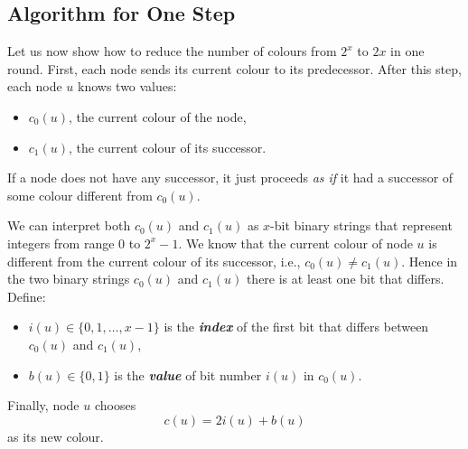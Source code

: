 \subsection{Algorithm for One Step}

Let us now show how to reduce the number of colours from $2^x$ to $2x$ in one round. First, each node sends its current colour to its predecessor. After this step, each node $u$ knows two values:
\begin{itemize}[noitemsep]
    \item $c_0(u)$, the current colour of the node,
    \item $c_1(u)$, the current colour of its successor.
\end{itemize}
If a node does not have any successor, it just proceeds \emph{as if} it had a successor of some colour different from $c_0(u)$.

We can interpret both $c_0(u)$ and $c_1(u)$ as $x$-bit binary strings that represent integers from range $0$ to $2^x-1$. We know that the current colour of node $u$ is different from the current colour of its successor, i.e., $c_0(u) \ne c_1(u)$. Hence in the two binary strings $c_0(u)$ and $c_1(u)$ there is at least one bit that differs. Define:
\begin{itemize}
    \item $i(u) \in \{0,1,\dotsc,x-1\}$ is the \emph{\textbf{index}} of the first bit that differs between $c_0(u)$ and $c_1(u)$,
    \item $b(u) \in \{0,1\}$ is the \emph{\textbf{value}} of bit number $i(u)$ in $c_0(u)$.
\end{itemize}
Finally, node $u$ chooses
\[
    c(u) = 2i(u) + b(u)
\]
as its new colour.


